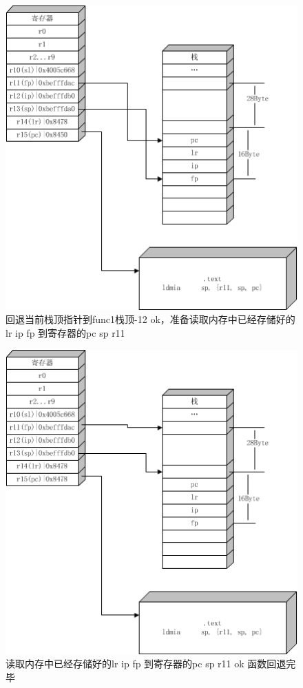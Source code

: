 \begin{figure}[htbp]%
\centering
\includegraphics[bb=0 0 427 445,scale=0.7]{armapcs1_12.png}
\caption{回退当前栈顶指针到func1栈顶-12 ok，准备读取内存中已经存储好的lr ip fp 到寄存器的pc sp r11}
\label{fig:anna}
\end{figure}

\begin{figure}[htbp]%
\centering
\includegraphics[bb=0 0 427 445,scale=0.7]{armapcs1_13.png}
\caption{读取内存中已经存储好的lr ip fp 到寄存器的pc sp r11 ok 函数回退完毕}
\label{fig:anna}
\end{figure}


